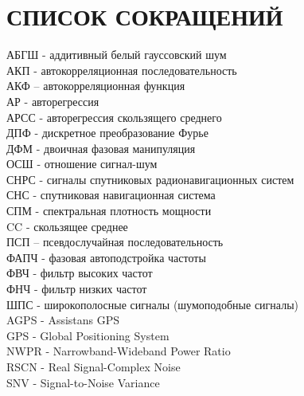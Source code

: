 \section*{СПИСОК СОКРАЩЕНИЙ}
АБГШ - аддитивный белый гауссовский шум				\\
АКП - автокорреляционная последовательность			\\
АКФ – автокорреляционная функция				\\
АР - авторегрессия						\\
АРСС - авторегрессия скользящего среднего			\\
ДПФ - дискретное преобразование Фурье				\\
ДФМ - двоичная фазовая манипуляция				\\
ОСШ - отношение сигнал-шум 					\\
СНРС - сигналы спутниковых радионавигационных систем		\\
СНС - спутниковая навигационная система				\\
СПМ - спектральная плотность мощности				\\
CC - скользящее среднее						\\
ПСП – псевдослучайная последовательность			\\
ФАПЧ - фазовая автоподстройка частоты				\\
ФВЧ - фильтр высоких частот					\\
ФНЧ - фильтр низких частот					\\
ШПС -  широкополосные сигналы (шумоподобные сигналы)		\\

AGPS - Assistans GPS						\\
GPS - Global Positioning System					\\
NWPR - Narrowband-Wideband Power Ratio				\\
RSCN - Real Signal-Complex Noise				\\
SNV - Signal-to-Noise Variance					\\

\newpage
